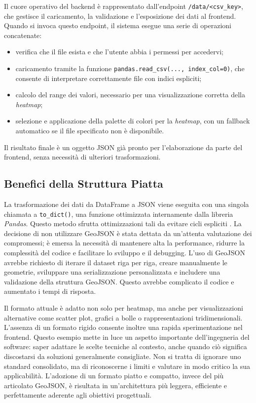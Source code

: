 Il cuore operativo del backend è rappresentato dall'endpoint \texttt{/data/<csv\_key>}, che gestisce il caricamento, la validazione e l'esposizione dei dati al frontend. Quando si invoca questo endpoint, il sistema esegue una serie di operazioni concatenate:

\begin{itemize}
  \item verifica che il file esista e che l'utente abbia i permessi per accedervi;
  \item caricamento tramite la funzione \texttt{pandas.read\_csv(..., index\_col=0)}, che consente di interpretare correttamente file con indici espliciti; \cite{pandas-readcsv}
  \item calcolo del range dei valori, necessario per una visualizzazione corretta della \textit{heatmap};
  \item selezione e applicazione della palette di colori per la \textit{heatmap}, con un fallback automatico se il file specificato non è disponibile.
\end{itemize}

Il risultato finale è un oggetto JSON già pronto per l'elaborazione da parte del frontend, senza necessità di ulteriori trasformazioni.

\newpage

\subsection{Benefici della Struttura Piatta}
\label{ss:why-not-geojson}

La trasformazione dei dati da DataFrame a JSON viene eseguita con una singola chiamata a \texttt{to\_dict()}, una funzione ottimizzata internamente dalla libreria \textit{Pandas}. Questo metodo sfrutta ottimizzazioni tali da evitare cicli espliciti \cite{pandas-performance}. La decisione di non utilizzare GeoJSON è stata dettata da un'attenta valutazione dei compromessi; è emersa la necessità di mantenere alta la performance, ridurre la complessità del codice e facilitare lo sviluppo e il debugging. L'uso di GeoJSON avrebbe richiesto di iterare il dataset riga per riga, creare manualmente le geometrie, sviluppare una serializzazione personalizzata e includere una validazione della struttura GeoJSON. Questo avrebbe complicato il codice e aumentato i tempi di risposta.

Il formato attuale è adatto non solo per heatmap, ma anche per visualizzazioni alternative come scatter plot, grafici a bolle o rappresentazioni tridimensionali. L'assenza di un formato rigido consente inoltre una rapida sperimentazione nel frontend.
Questo esempio mette in luce un aspetto importante dell'ingegneria del software: saper adattare le scelte tecniche al contesto, anche quando ciò significa discostarsi da soluzioni generalmente consigliate. Non si tratta di ignorare uno standard consolidato, ma di riconoscerne i limiti e valutare in modo critico la sua applicabilità. L'adozione di un formato piatto e compatto, invece del più articolato GeoJSON, è risultata in un'architettura più leggera, efficiente e perfettamente aderente agli obiettivi progettuali.

